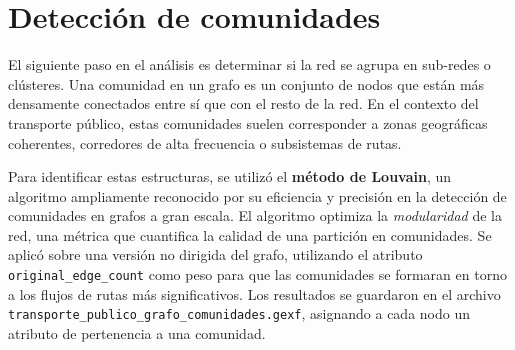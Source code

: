         \section{Detección de comunidades}

    El siguiente paso en el análisis es determinar si la red se agrupa en sub-redes o clústeres. Una comunidad en un grafo es un conjunto de nodos que están más densamente conectados entre sí que con el resto de la red. En el contexto del transporte público, estas comunidades suelen corresponder a zonas geográficas coherentes, corredores de alta frecuencia o subsistemas de rutas.

    Para identificar estas estructuras, se utilizó el \textbf{método de Louvain}, un algoritmo ampliamente reconocido por su eficiencia y precisión en la detección de comunidades en grafos a gran escala. El algoritmo optimiza la \textit{modularidad} de la red, una métrica que cuantifica la calidad de una partición en comunidades. Se aplicó sobre una versión no dirigida del grafo, utilizando el atributo \texttt{original\_edge\_count} como peso para que las comunidades se formaran en torno a los flujos de rutas más significativos. Los resultados se guardaron en el archivo \texttt{transporte\_publico\_grafo\_comunidades.gexf}, asignando a cada nodo un atributo de pertenencia a una comunidad.

